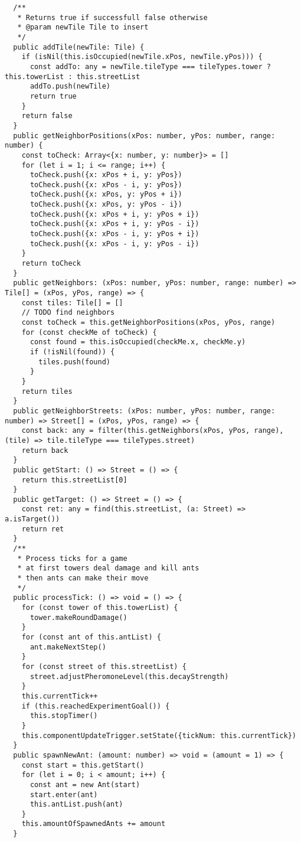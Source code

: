 \begin{lstlisting}
  /**
   * Returns true if successfull false otherwise
   * @param newTile Tile to insert
   */
  public addTile(newTile: Tile) {
    if (isNil(this.isOccupied(newTile.xPos, newTile.yPos))) {
      const addTo: any = newTile.tileType === tileTypes.tower ? this.towerList : this.streetList
      addTo.push(newTile)
      return true
    }
    return false
  }
  public getNeighborPositions(xPos: number, yPos: number, range: number) {
    const toCheck: Array<{x: number, y: number}> = []
    for (let i = 1; i <= range; i++) {
      toCheck.push({x: xPos + i, y: yPos})
      toCheck.push({x: xPos - i, y: yPos})
      toCheck.push({x: xPos, y: yPos + i})
      toCheck.push({x: xPos, y: yPos - i})
      toCheck.push({x: xPos + i, y: yPos + i})
      toCheck.push({x: xPos + i, y: yPos - i})
      toCheck.push({x: xPos - i, y: yPos + i})
      toCheck.push({x: xPos - i, y: yPos - i})
    }
    return toCheck
  }
  public getNeighbors: (xPos: number, yPos: number, range: number) => Tile[] = (xPos, yPos, range) => {
    const tiles: Tile[] = []
    // TODO find neighbors
    const toCheck = this.getNeighborPositions(xPos, yPos, range)
    for (const checkMe of toCheck) {
      const found = this.isOccupied(checkMe.x, checkMe.y)
      if (!isNil(found)) {
        tiles.push(found)
      }
    }
    return tiles
  }
  public getNeighborStreets: (xPos: number, yPos: number, range: number) => Street[] = (xPos, yPos, range) => {
    const back: any = filter(this.getNeighbors(xPos, yPos, range), (tile) => tile.tileType === tileTypes.street)
    return back
  }
  public getStart: () => Street = () => {
    return this.streetList[0]
  }
  public getTarget: () => Street = () => {
    const ret: any = find(this.streetList, (a: Street) => a.isTarget())
    return ret
  }
  /**
   * Process ticks for a game
   * at first towers deal damage and kill ants
   * then ants can make their move
   */
  public processTick: () => void = () => {
    for (const tower of this.towerList) {
      tower.makeRoundDamage()
    }
    for (const ant of this.antList) {
      ant.makeNextStep()
    }
    for (const street of this.streetList) {
      street.adjustPheromoneLevel(this.decayStrength)
    }
    this.currentTick++
    if (this.reachedExperimentGoal()) {
      this.stopTimer()
    }
    this.componentUpdateTrigger.setState({tickNum: this.currentTick})
  }
  public spawnNewAnt: (amount: number) => void = (amount = 1) => {
    const start = this.getStart()
    for (let i = 0; i < amount; i++) {
      const ant = new Ant(start)
      start.enter(ant)
      this.antList.push(ant)
    }
    this.amountOfSpawnedAnts += amount
  }


\end{lstlisting}
